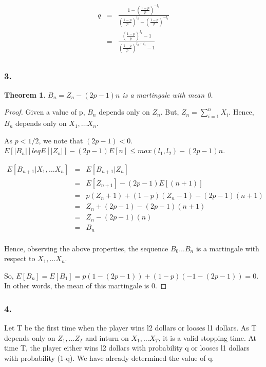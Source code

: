\documentclass[10pt]{amsart}
\newtheorem{thm}{Theorem}[subsection]
\theoremstyle{remark}
\begin{document}
\begin{eqnarray*}
q &=& \frac{1 - (\frac{1-p}{p})^{-l_{1}}}{(\frac{1-p}{p})^{l_{2}} - (\frac{1-p}{p})^{-l_{1}}}\\
&=& \frac{(\frac{1-p}{p})^{l_{1}} - 1}{(\frac{1-p}{p})^{l_{2}+l_{1}} - 1}\\
\end{eqnarray*}

\subsubsection{3.}
\begin{thm}
$B_{n}=Z_{n}-(2p-1)n$ is a martingale with mean 0.
\end{thm}
\begin{proof}
Given a value of p, $B_{n}$ depends only on $Z_{n}$. But, $Z_{n} = \sum_{i=1}^{n} X_{i}$. Hence, $B_{n}$ depends only on $X_{1}, \dots X_{n}$.

As $p<1/2$, we note that $(2p-1) < 0$. $E[|B_{n}|] leq E[|Z_{n}|]-(2p-1)E[n] \leq max(l_{1}, l_{2})-(2p-1)n$.

\begin{eqnarray*}
E[B_{n+1}|X_{1}, \dots X_{n}] &=& E[B_{n+1}|Z_{n}] \\
 &=& E[Z_{n+1}]-(2p-1)E[(n+1)]\\
 &=& p(Z_{n}+1) + (1-p)(Z_{n}-1)-(2p-1)(n+1)\\
 &=& Z_{n} + (2p-1) -(2p-1)(n+1)\\
 &=& Z_{n} -(2p-1)(n)\\
 &=& B_{n}\\
\end{eqnarray*}

Hence, observing the above properties, the sequence $B_{0} \dots B_{n}$ is a martingale with respect to $X_{1}, \dots X_{n}$.

So, $E[B_{n}] = E[B_{1}] = p(1-(2p-1)) + (1-p)(-1-(2p-1)) = 0$. In other words, the mean of this martingale is 0.
\end{proof}

\subsubsection{4.}
Let T be the first time when the player wins l2 dollars or looses l1 dollars. As T depends only on $Z_{1}, \dots Z_{T}$ and inturn on $X_{1}, \dots X_{T}$, it is a valid stopping time. At time T, the player either wins l2 dollars with probability q or looses l1 dollars with probability (1-q). We have already determined the value of q.
\end{document}
